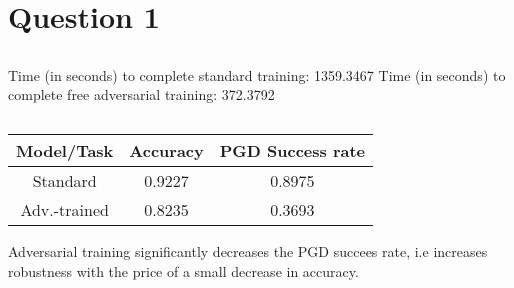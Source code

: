 \documentclass{article}
\begin{document}
\section{Question 1}
\setcounter{subsection}{2}
\subsection{}
Time (in seconds) to complete standard training: 1359.3467
Time (in seconds) to complete free adversarial training: 372.3792
\subsection{}
\begin{center}
\begin{tabular}{||c c c||} 
    \hline
    Model/Task & Accuracy & PGD Success rate \\ [0.5ex] 
    \hline\hline
    Standard & 0.9227 & 0.8975 \\ 
    \hline
    Adv.-trained & 0.8235 & 0.3693 \\
    \hline
\end{tabular}
\end{center}
Adversarial training significantly decreases the PGD succees rate, i.e increases robustness with the price of a small decrease in accuracy.
\end{document}
